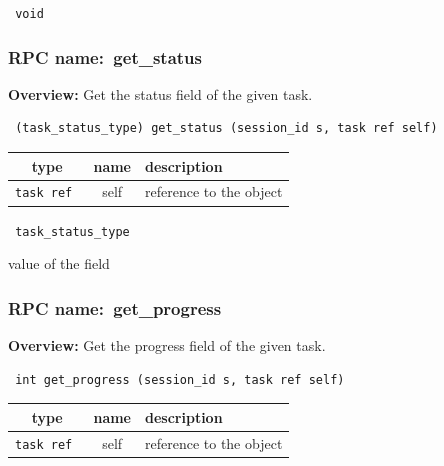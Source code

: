\vspace{0.3cm}

{\tt 
void
}



\vspace{0.3cm}
\vspace{0.3cm}
\vspace{0.3cm}
\subsubsection{RPC name:~get\_status}

{\bf Overview:} 
Get the status field of the given task.

\begin{verbatim} (task_status_type) get_status (session_id s, task ref self)\end{verbatim}



 
\vspace{0.3cm}
\begin{tabular}{|c|c|p{7cm}|}
 \hline
{\bf type} & {\bf name} & {\bf description} \\ \hline
{\tt task ref } & self & reference to the object \\ \hline 

\end{tabular}

\vspace{0.3cm}

{\tt 
task\_status\_type
}


value of the field
\vspace{0.3cm}
\vspace{0.3cm}
\vspace{0.3cm}
\subsubsection{RPC name:~get\_progress}

{\bf Overview:} 
Get the progress field of the given task.

\begin{verbatim} int get_progress (session_id s, task ref self)\end{verbatim}



 
\vspace{0.3cm}
\begin{tabular}{|c|c|p{7cm}|}
 \hline
{\bf type} & {\bf name} & {\bf description} \\ \hline
{\tt task ref } & self & reference to the object \\ \hline 

\end{tabular}


